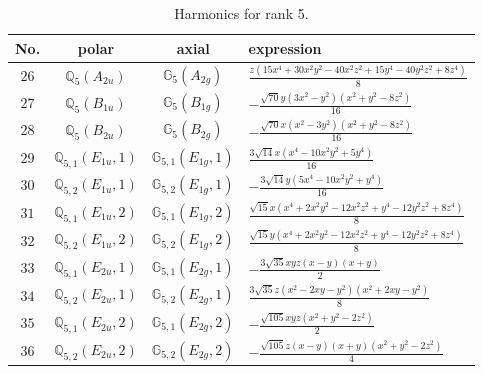 \documentclass[fleqn,8pt,landscape]{jsarticle}
\begin{document}
\begin{table}[ht!]
\begin{center}
\caption{Harmonics for rank 5.}
\renewcommand{\arraystretch}{1.3}
\begin{tabular}{cccl} \hline \hline
No. & polar & axial & expression \\ \hline
$ 26 $ & $ \mathbb{Q}_{5}(A_{2u}) $ & $ \mathbb{G}_{5}(A_{2g}) $ & $ \frac{z \left(15 x^{4} + 30 x^{2} y^{2} - 40 x^{2} z^{2} + 15 y^{4} - 40 y^{2} z^{2} + 8 z^{4}\right)}{8} $ \\
$ 27 $ & $ \mathbb{Q}_{5}(B_{1u}) $ & $ \mathbb{G}_{5}(B_{1g}) $ & $ - \frac{\sqrt{70} y \left(3 x^{2} - y^{2}\right) \left(x^{2} + y^{2} - 8 z^{2}\right)}{16} $ \\
$ 28 $ & $ \mathbb{Q}_{5}(B_{2u}) $ & $ \mathbb{G}_{5}(B_{2g}) $ & $ - \frac{\sqrt{70} x \left(x^{2} - 3 y^{2}\right) \left(x^{2} + y^{2} - 8 z^{2}\right)}{16} $ \\
$ 29 $ & $ \mathbb{Q}_{5,1}(E_{1u},1) $ & $ \mathbb{G}_{5,1}(E_{1g},1) $ & $ \frac{3 \sqrt{14} x \left(x^{4} - 10 x^{2} y^{2} + 5 y^{4}\right)}{16} $ \\
$ 30 $ & $ \mathbb{Q}_{5,2}(E_{1u},1) $ & $ \mathbb{G}_{5,2}(E_{1g},1) $ & $ - \frac{3 \sqrt{14} y \left(5 x^{4} - 10 x^{2} y^{2} + y^{4}\right)}{16} $ \\
$ 31 $ & $ \mathbb{Q}_{5,1}(E_{1u},2) $ & $ \mathbb{G}_{5,1}(E_{1g},2) $ & $ \frac{\sqrt{15} x \left(x^{4} + 2 x^{2} y^{2} - 12 x^{2} z^{2} + y^{4} - 12 y^{2} z^{2} + 8 z^{4}\right)}{8} $ \\
$ 32 $ & $ \mathbb{Q}_{5,2}(E_{1u},2) $ & $ \mathbb{G}_{5,2}(E_{1g},2) $ & $ \frac{\sqrt{15} y \left(x^{4} + 2 x^{2} y^{2} - 12 x^{2} z^{2} + y^{4} - 12 y^{2} z^{2} + 8 z^{4}\right)}{8} $ \\
$ 33 $ & $ \mathbb{Q}_{5,1}(E_{2u},1) $ & $ \mathbb{G}_{5,1}(E_{2g},1) $ & $ - \frac{3 \sqrt{35} x y z \left(x - y\right) \left(x + y\right)}{2} $ \\
$ 34 $ & $ \mathbb{Q}_{5,2}(E_{2u},1) $ & $ \mathbb{G}_{5,2}(E_{2g},1) $ & $ \frac{3 \sqrt{35} z \left(x^{2} - 2 x y - y^{2}\right) \left(x^{2} + 2 x y - y^{2}\right)}{8} $ \\
$ 35 $ & $ \mathbb{Q}_{5,1}(E_{2u},2) $ & $ \mathbb{G}_{5,1}(E_{2g},2) $ & $ - \frac{\sqrt{105} x y z \left(x^{2} + y^{2} - 2 z^{2}\right)}{2} $ \\
$ 36 $ & $ \mathbb{Q}_{5,2}(E_{2u},2) $ & $ \mathbb{G}_{5,2}(E_{2g},2) $ & $ - \frac{\sqrt{105} z \left(x - y\right) \left(x + y\right) \left(x^{2} + y^{2} - 2 z^{2}\right)}{4} $ \\
 \hline \hline
\end{tabular}
\end{center}
\end{table}
\end{document}
